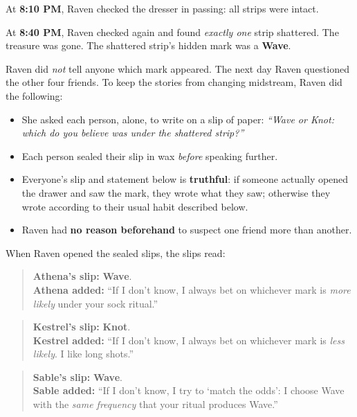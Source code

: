 \medskip

At \textbf{8:10 PM}, Raven checked the dresser in passing: all strips were intact.

At \textbf{8:40 PM}, Raven checked again and found \emph{exactly one} strip shattered.
The treasure was gone. The shattered strip's hidden mark was a \textbf{Wave}.

\medskip

Raven did \emph{not} tell anyone which mark appeared. The next day Raven questioned the other four friends.
To keep the stories from changing midstream, Raven did the following:

\begin{itemize}
\item She asked each person, alone, to write on a slip of paper:
\textit{``Wave or Knot: which do you believe was under the shattered strip?''}
\item Each person sealed their slip in wax \emph{before} speaking further.
\item Everyone's slip and statement below is \textbf{truthful}:
if someone actually opened the drawer and saw the mark, they wrote what they saw;
otherwise they wrote according to their usual habit described below.
\item Raven had \textbf{no reason beforehand} to suspect one friend more than another.
\end{itemize}

When Raven opened the sealed slips, the slips read:

\begin{quote}
\textbf{Athena's slip:} \textbf{Wave}. \\
\textbf{Athena added:} ``If I don't know, I always bet on whichever mark is \emph{more likely} under your sock ritual.''
\end{quote}

\begin{quote}
\textbf{Kestrel's slip:} \textbf{Knot}. \\
\textbf{Kestrel added:} ``If I don't know, I always bet on whichever mark is \emph{less likely}. I like long shots.''
\end{quote}

\begin{quote}
\textbf{Sable's slip:} \textbf{Wave}. \\
\textbf{Sable added:} ``If I don't know, I try to `match the odds': I choose Wave with the \emph{same frequency}
that your ritual produces Wave.''
\end{quote}

